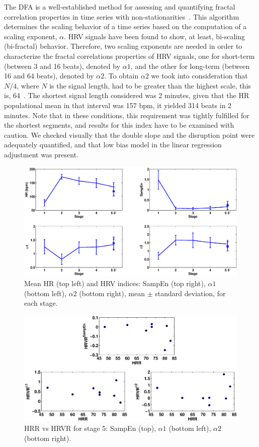 The DFA is a well-established method for assessing and quantifying fractal correlation properties in time series with non-stationarities~\cite{peng95}. This algorithm determines the scaling behavior of a time series based on the computation of a scaling exponent, $\alpha$. HRV signals have been found to show, at least, bi-scaling (bi-fractal) behavior. Therefore, two scaling exponents are needed in order to characterize the fractal correlations properties of  HRV signals, one for short-term (between 3 and 16 beats), denoted by $\alpha1$, and the other for long-term (between 16 and 64 beats), denoted by $\alpha2$.
To obtain $\alpha2$ we took into consideration that $N/4$, where $N$ is the signal length, had to be greater than the highest scale, this is, 64~\cite{Kantelhardt02}. The shortest signal length considered was 2 minutes, given that the HR populational mean  in that interval was 157 bpm, it yielded 314 beats in 2 minutes. Note that in these conditions, this requirement was tightly fulfilled for the shortest segments, and results for this index have to be examined with caution. We checked visually that the double slope and the disruption point were adequately quantified, and that low bias model in the linear regression adjustment was present. 

\begin{figure}[!t]
\centering
\includegraphics[width=16cm]{./figs/indicesvsHR.eps}
\caption{Mean HR (top left) and HRV indices: SampEn (top right), $\alpha1$ (bottom left), $\alpha2$ (bottom right), mean $\pm$ standard deviation, for each stage.}
\label{fig:indicesvsHR}
\end{figure}

\begin{figure}[!t]
\centering
\includegraphics[width=16cm]{./figs/HRRvsHRVR.eps}
\caption{HRR vs HRVR for stage 5: SampEn (top), $\alpha1$ (bottom left), $\alpha2$ (bottom right).}
\label{fig:HRRvsHRVR}
\end{figure} 


